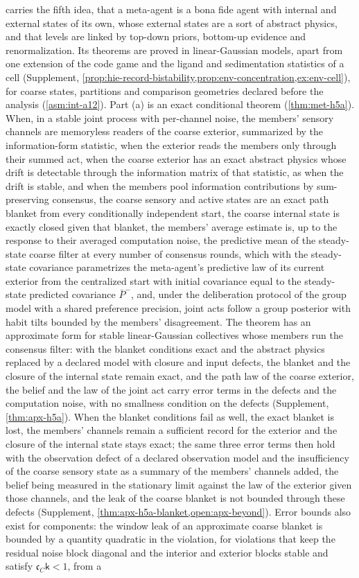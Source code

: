  carries the fifth idea, that a meta-agent is a bona fide agent with internal and external states of its own, whose external states are a sort of abstract physics, and that levels are linked by top-down priors, bottom-up evidence and renormalization. Its theorems are proved in linear-Gaussian models, apart from one extension of the code game and the ligand and sedimentation statistics of a cell (Supplement, \cref{prop:hie-record-bistability,prop:env-concentration,ex:env-cell}), for coarse states, partitions and comparison geometries declared before the analysis (\cref{asm:int-a12}). Part (a) is an exact conditional theorem (\cref{thm:met-h5a}). When, in a stable joint process with per-channel noise, the members' sensory channels are memoryless readers of the coarse exterior, summarized by the information-form statistic, when the exterior reads the members only through their summed act, when the coarse exterior has an exact abstract physics whose drift is detectable through the information matrix of that statistic, as when the drift is stable, and when the members pool information contributions by sum-preserving consensus, the coarse sensory and active states are an exact path blanket from every conditionally independent start, the coarse internal state is exactly closed given that blanket, the members' average estimate is, up to the response to their averaged computation noise, the predictive mean of the steady-state coarse filter at every number of consensus rounds, which with the steady-state covariance parametrizes the meta-agent's predictive law of its current exterior from the centralized start with initial covariance equal to the steady-state predicted covariance $\bar P^-$, and, under the deliberation protocol of the group model with a shared preference precision, joint acts follow a group posterior with habit tilts bounded by the members' disagreement. The theorem has an approximate form for stable linear-Gaussian collectives whose members run the consensus filter: with the blanket conditions exact and the abstract physics replaced by a declared model with closure and input defects, the blanket and the closure of the internal state remain exact, and the path law of the coarse exterior, the belief and the law of the joint act carry error terms in the defects and the computation noise, with no smallness condition on the defects (Supplement, \cref{thm:apx-h5a}). When the blanket conditions fail as well, the exact blanket is lost, the members' channels remain a sufficient record for the exterior and the closure of the internal state stays exact; the same three error terms then hold with the observation defect of a declared observation model and the insufficiency of the coarse sensory state as a summary of the members' channels added, the belief being measured in the stationary limit against the law of the exterior given those channels, and the leak of the coarse blanket is not bounded through these defects (Supplement, \cref{thm:apx-h5a-blanket,open:apx-beyond}). Error bounds also exist for components: the window leak of an approximate coarse blanket is bounded by a quantity quadratic in the violation, for violations that keep the residual noise block diagonal and the interior and exterior blocks stable and satisfy $\mathfrak c_C\mathsf k<1$, from a 